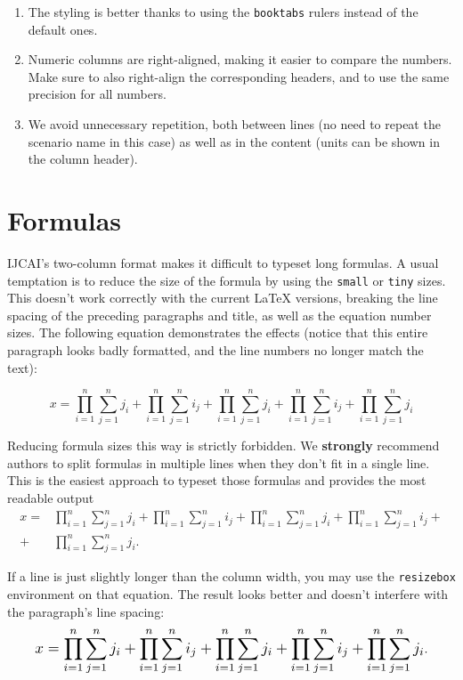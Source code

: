 \documentclass{article}
\begin{document}
\begin{enumerate}
	\item The styling is better thanks to using the {\tt booktabs} rulers instead of the default ones.
	\item Numeric columns are right-aligned, making it easier to compare the numbers. Make sure to also right-align the corresponding headers, and to use the same precision for all numbers.
	\item We avoid unnecessary repetition, both between lines (no need to repeat the scenario name in this case) as well as in the content (units can be shown in the column header).
\end{enumerate}

\section{Formulas}

IJCAI's two-column format makes it difficult to typeset long formulas. A usual temptation is to reduce the size of the formula by using the {\tt small} or {\tt tiny} sizes. This doesn't work correctly with the current \LaTeX{} versions, breaking the line spacing of the preceding paragraphs and title, as well as the equation number sizes. The following equation demonstrates the effects (notice that this entire paragraph looks badly formatted, and the line numbers no longer match the text):
%
\begin{tiny}
	\begin{equation}
		x = \prod_{i=1}^n \sum_{j=1}^n j_i + \prod_{i=1}^n \sum_{j=1}^n i_j + \prod_{i=1}^n \sum_{j=1}^n j_i + \prod_{i=1}^n \sum_{j=1}^n i_j + \prod_{i=1}^n \sum_{j=1}^n j_i
	\end{equation}
\end{tiny}%

Reducing formula sizes this way is strictly forbidden. We {\bf strongly} recommend authors to split formulas in multiple lines when they don't fit in a single line. This is the easiest approach to typeset those formulas and provides the most readable output%
%
\begin{align}
	x = & \prod_{i=1}^n \sum_{j=1}^n j_i + \prod_{i=1}^n \sum_{j=1}^n i_j + \prod_{i=1}^n \sum_{j=1}^n j_i + \prod_{i=1}^n \sum_{j=1}^n i_j + \nonumber \\
	+   & \prod_{i=1}^n \sum_{j=1}^n j_i.
\end{align}%

If a line is just slightly longer than the column width, you may use the {\tt resizebox} environment on that equation. The result looks better and doesn't interfere with the paragraph's line spacing: %
\begin{equation}
	\resizebox{.91\linewidth}{!}{$
			\displaystyle
			x = \prod_{i=1}^n \sum_{j=1}^n j_i + \prod_{i=1}^n \sum_{j=1}^n i_j + \prod_{i=1}^n \sum_{j=1}^n j_i + \prod_{i=1}^n \sum_{j=1}^n i_j + \prod_{i=1}^n \sum_{j=1}^n j_i
		$}.
\end{equation}%
\end{document}
